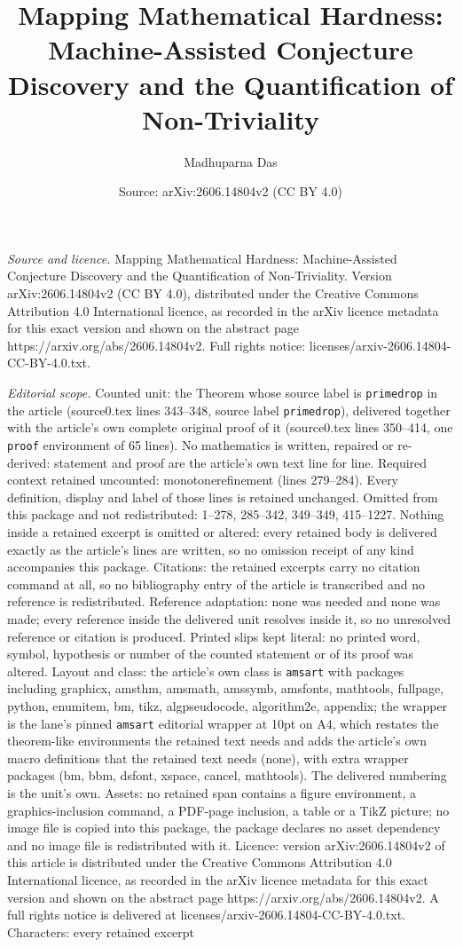 \documentclass[10pt,a4paper]{amsart}
\title[Mapping Mathematical Hardness: Machine-Assisted Conjecture D]{Mapping Mathematical Hardness: Machine-Assisted Conjecture Discovery and the Quantification of Non-Triviality}
\author{Madhuparna Das}
\date{Source: arXiv:2606.14804v2 (CC BY 4.0)}
\begin{document}
\maketitle

\noindent\emph{Source and licence.} Mapping Mathematical Hardness: Machine-Assisted Conjecture Discovery and the Quantification of Non-Triviality. Version arXiv:2606.14804v2 (CC BY 4.0), distributed under the Creative Commons Attribution 4.0 International licence, as recorded in the arXiv licence metadata for this exact version and shown on the abstract page https://arxiv.org/abs/2606.14804v2. Full rights notice: licenses/arxiv-2606.14804-CC-BY-4.0.txt.\par\smallskip

\noindent\textit{Editorial scope.} Counted unit: the Theorem whose source label is \texttt{primedrop} in the article (source0.tex lines 343--348, source label \texttt{primedrop}), delivered together with the article's own complete original proof of it (source0.tex lines 350--414, one \texttt{proof} environment of 65 lines). No mathematics is written, repaired or re-derived: statement and proof are the article's own text line for line. Required context retained uncounted: monotonerefinement (lines 279--284). Every definition, display and label of those lines is retained unchanged. Omitted from this package and not redistributed: 1--278, 285--342, 349--349, 415--1227. Nothing inside a retained excerpt is omitted or altered: every retained body is delivered exactly as the article's lines are written, so no omission receipt of any kind accompanies this package. Citations: the retained excerpts carry no citation command at all, so no bibliography entry of the article is transcribed and no reference is redistributed. Reference adaptation: none was needed and none was made; every reference inside the delivered unit resolves inside it, so no unresolved reference or citation is produced. Printed slips kept literal: no printed word, symbol, hypothesis or number of the counted statement or of its proof was altered. Layout and class: the article's own class is \texttt{amsart} with packages including graphicx, amsthm, amsmath, amssymb, amsfonts, mathtools, fullpage, python, enumitem, bm, tikz, algpseudocode, algorithm2e, appendix; the wrapper is the lane's pinned \texttt{amsart} editorial wrapper at 10pt on A4, which restates the theorem-like environments the retained text needs and adds the article's own macro definitions that the retained text needs (none), with extra wrapper packages (bm, bbm, dsfont, xspace, cancel, mathtools). The delivered numbering is the unit's own. Assets: no retained span contains a figure environment, a graphics-inclusion command, a PDF-page inclusion, a table or a TikZ picture; no image file is copied into this package, the package declares no asset dependency and no image file is redistributed with it. Licence: version arXiv:2606.14804v2 of this article is distributed under the Creative Commons Attribution 4.0 International licence, as recorded in the arXiv licence metadata for this exact version and shown on the abstract page https://arxiv.org/abs/2606.14804v2. A full rights notice is delivered at licenses/arxiv-2606.14804-CC-BY-4.0.txt. Characters: every retained excerpt 
\end{document}
